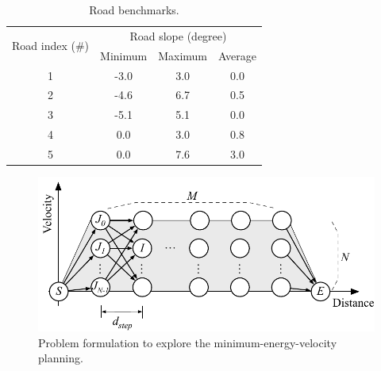 \documentclass{IEEEtran}
\begin{document}
\begin{table} 
\caption{Road benchmarks.}
\centering
\label{table:road_bench}
\begin{tabular}{|c|c|c|c|}  \hline
\multirow{2}{*}{Road index (\#)}
			&\multicolumn{3}{|c|}{Road slope (degree)}  \\ \cline{2-4}
			&Minimum 	&Maximum 	&Average \\ \hline
1			&-3.0 		&3.0 			&0.0 	  	\\ \hline
2			&-4.6 		&6.7 			&0.5 		\\ \hline
3			&-5.1 		&5.1 			&0.0 		\\ \hline
4			&0.0 			&3.0 			&0.8		\\ \hline
5			&0.0 			&7.6 			&3.0 		\\ \hline

\end{tabular}
\end{table}

\begin{figure} [h]%
\includegraphics[width=1.0\hsize]{Figures/Opt_drive_problem.pdf}
\caption{Problem formulation to explore the minimum-energy-velocity planning.}
\label{fig:Opt_drive_problem}
\end{figure}
\end{document}
